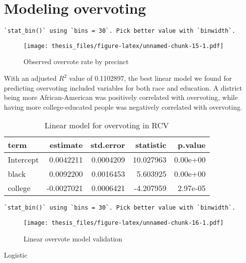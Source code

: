 \documentclass[12pt,twoside]{reedthesis}
\begin{document}
\hypertarget{modeling-overvoting}{%
\section{Modeling overvoting}\label{modeling-overvoting}}
\begin{verbatim}
`stat_bin()` using `bins = 30`. Pick better value with `binwidth`.
\end{verbatim}
\begin{figure}
\centering
\texttt{[image: thesis\_files/figure-latex/unnamed-chunk-15-1.pdf]}
\caption{\label{fig:unnamed-chunk-15}Observed overvote rate by precinct}
\end{figure}
With an adjusted \(R^2\) value of 0.1102897, the best linear model we found for predicting overvoting included variables for both race and education. A district being more African-American was positively correlated with overvoting, while having more college-educated people was negatively correlated with overvoting.
\begin{longtable}{lrrrr}
\caption[Linear overvote model]{\label{tab:unnamed-chunk-16}Linear model for overvoting in RCV}\\
\toprule
term & estimate & std.error & statistic & p.value\\
\midrule
Intercept & 0.0042211 & 0.0004209 & 10.027963 & 0.00e+00\\
black & 0.0092200 & 0.0016453 & 5.603925 & 0.00e+00\\
college & -0.0027021 & 0.0006421 & -4.207959 & 2.97e-05\\
\bottomrule
\end{longtable}
\begin{verbatim}
`stat_bin()` using `bins = 30`. Pick better value with `binwidth`.
\end{verbatim}
\begin{figure}
\centering
\texttt{[image: thesis\_files/figure-latex/unnamed-chunk-16-1.pdf]}
\caption{\label{fig:unnamed-chunk-16}Linear overvote model validation}
\end{figure}
Logistic
\end{document}
